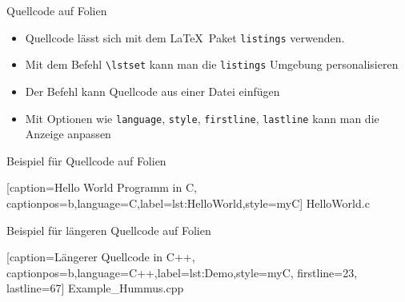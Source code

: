 \documentclass[mathserif,serif,german]{beamer}
\begin{document}
\begin{frame}[fragile]{Quellcode auf Folien}
	
	\begin{itemize}
		\item Quellcode lässt sich mit dem \LaTeX~Paket \verb|listings| verwenden.
		\item Mit dem Befehl \verb|\lstset| kann man die \verb|listings| Umgebung personalisieren
		\item Der Befehl \verb|| kann Quellcode aus einer Datei einfügen
		\item Mit Optionen wie \verb|language|, \verb|style|, \verb|firstline|, \verb|lastline| kann man die Anzeige anpassen
	\end{itemize}
	
	
\end{frame}	


\begin{frame}[fragile]{Beispiel für Quellcode auf Folien}
	
	
	[caption={Hello World Programm in C},
	captionpos=b,language=C,label={lst:HelloWorld},style=myC]
	{HelloWorld.c}
	
\end{frame}	


\begin{frame}[fragile,shrink=50]{Beispiel für längeren Quellcode auf Folien}
	
	
	\footnotesize
	
	[caption={Längerer Quellcode in C++},
	captionpos=b,language=C++,label={lst:Demo},style=myC, firstline=23, lastline=67]
	{Example_Hummus.cpp}	
	
\end{frame}	
\end{document}
